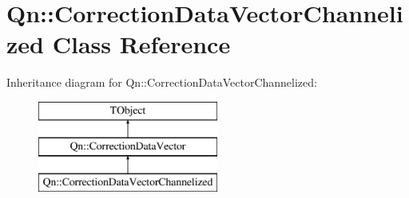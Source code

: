 \hypertarget{classQn_1_1CorrectionDataVectorChannelized}{}\section{Qn\+:\+:Correction\+Data\+Vector\+Channelized Class Reference}
\label{classQn_1_1CorrectionDataVectorChannelized}
Inheritance diagram for Qn\+:\+:Correction\+Data\+Vector\+Channelized\+:\begin{figure}[H]
\begin{center}
\leavevmode
\includegraphics[height=3.000000cm]{classQn_1_1CorrectionDataVectorChannelized}
\end{center}
\end{figure}
